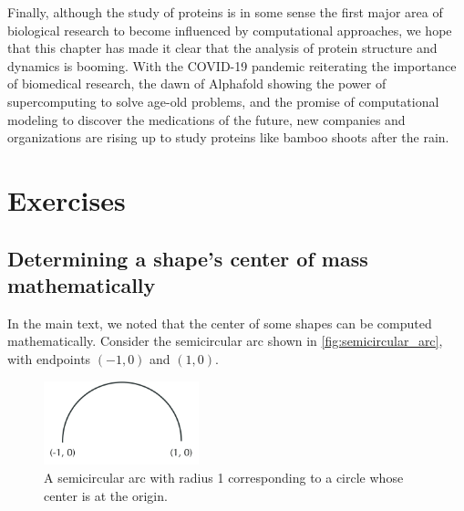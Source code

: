 Finally, although the study of proteins is in some sense the first major area of biological research to become influenced by computational approaches, we hope that this chapter has made it clear that the analysis of protein structure and dynamics is booming. With the COVID-19 pandemic reiterating the importance of biomedical research, the dawn of Alphafold showing the power of supercomputing to solve age-old problems, and the promise of computational modeling to discover the medications of the future, new companies and organizations are rising up to study proteins like bamboo shoots after the rain.

\newpage

\FloatBarrier
\section{Exercises}
\label{sec:coronavirus_exercises}

\subsection{Determining a shape's center of mass mathematically}

In the main text, we noted that the center of some shapes can be computed mathematically. Consider the semicircular arc shown in \autoref{fig:semicircular_arc}, with endpoints $(-1, 0)$ and $(1, 0)$.\\


\begin{figure}[h]
	\centering
	\mySfFamily
	\includegraphics[width = 0.4\textwidth]{../images_CMYK/semicircular_arc}
	\caption{A semicircular arc with radius 1 corresponding to a circle whose center is at the origin.}
	\label{fig:semicircular_arc}
\end{figure}

